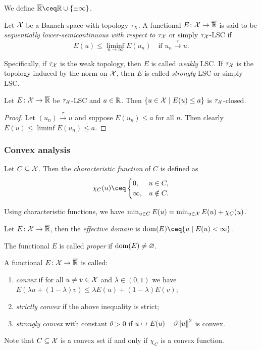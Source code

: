 We define $\rext \ceq \RR\cup \qty{\pm\infty}$. 

\begin{definition}
	Let $\mathcal X$ be a Banach space with topology $\tau_X$. A functional $E \colon \mathcal X \to\overline{\mathbb R}$ is said to be \emph{sequentially lower-semicontinuous with respect to $\tau_\mathcal X$} or simply $\tau_\mathcal X$-LSC if
	\[
	E(u) \leq \liminf_{n\to\infty} E(u_n)\quad\text{if $u_n \overset\tau\to u$}. 
	\]
	
	Specifically, if $\tau_\mathcal X$ is the weak topology, then $E$ is called \emph{weakly} LSC. If $\tau_\mathcal X$ is the topology induced by the norm on $\mathcal X$, then $E$ is called \emph{strongly} LSC or simply LSC.
\end{definition}


\begin{lemma} \label{lem:lsc_closed_sets}
	Let $E \colon \mathcal X \to \overline{\mathbb R}$ be $\tau_\mathcal X$-LSC and $a \in \mathbb R$. Then $\qty{u \in \mathcal X\mid E(u) \leq a}$ is $\tau_\mathcal X$-closed. 
\end{lemma}

\begin{proof}
	Let $(u_n) \overset\tau\to u$ and suppose $E(u_n) \leq a$ for all $n$. Then clearly $E(u) \leq \liminf E(u_n) \leq a$. 
\end{proof}

\subsubsection{Convex analysis}
\begin{definition}
	Let $C \subseteq \mathcal X$. Then the \emph{characteristic function} of $C$ is defined as 
	\[
	\chi_C(u) \ceq \begin{cases} 0, &u \in C, \\ \infty,& u \notin C. \end{cases}
	\]
\end{definition}
Using characteristic functions, we have $\min_{u \in C} E(u) = \min_{u \in \mathcal X} E(u) + \chi_C(u)$. 

\begin{definition}
	Let $E \colon \mathcal X \to \overline{\mathbb R}$, then the \emph{effective domain} is $\dom(E) \ceq \qty{u \mid E(u) < \infty}$. 
	
	The functional $E$ is called \emph{proper} if $\operatorname{dom}(E) \neq\varnothing$. 
\end{definition}

\begin{definition}
	A functional $E \colon \mathcal X \to \overline{\mathbb R}$ is called:
	\begin{enumerate}
		\item \emph{convex} if for all $u \neq v \in \mathcal X$ and $\lambda \in (0, 1)$ we have $E(\lambda u + (1-\lambda) v) \leq \lambda E(u) + (1-\lambda) E(v)$;
		\item \emph{strictly convex} if the above inequality is strict;
		\item \emph{strongly convex} with constant $\theta > 0$ if $u \mapsto E(u) - \vartheta \norm{u}^2$ is convex. 
	\end{enumerate}

Note that $C \subseteq \mathcal X$ is a convex set if and only if $\chi_C$ is a convex function. 
\end{definition}

